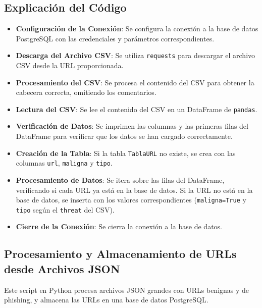 \subsection*{Explicación del Código}

\begin{itemize}
    \item \textbf{Configuración de la Conexión}: Se configura la conexión a la base de datos PostgreSQL con las credenciales y parámetros correspondientes.
    \item \textbf{Descarga del Archivo CSV}: Se utiliza \texttt{requests} para descargar el archivo CSV desde la URL proporcionada.
    \item \textbf{Procesamiento del CSV}: Se procesa el contenido del CSV para obtener la cabecera correcta, omitiendo los comentarios.
    \item \textbf{Lectura del CSV}: Se lee el contenido del CSV en un DataFrame de \texttt{pandas}.
    \item \textbf{Verificación de Datos}: Se imprimen las columnas y las primeras filas del DataFrame para verificar que los datos se han cargado correctamente.
    \item \textbf{Creación de la Tabla}: Si la tabla \texttt{TablaURL} no existe, se crea con las columnas \texttt{url}, \texttt{maligna} y \texttt{tipo}.
    \item \textbf{Procesamiento de Datos}: Se itera sobre las filas del DataFrame, verificando si cada URL ya está en la base de datos. Si la URL no está en la base de datos, se inserta con los valores correspondientes (\texttt{maligna=True} y \texttt{tipo} según el \texttt{threat} del CSV).
    \item \textbf{Cierre de la Conexión}: Se cierra la conexión a la base de datos.
\end{itemize}



\subsection*{Procesamiento y Almacenamiento de URLs desde Archivos JSON}

Este script en Python procesa archivos JSON grandes con URLs benignas y de phishing, y almacena las URLs en una base de datos PostgreSQL.

